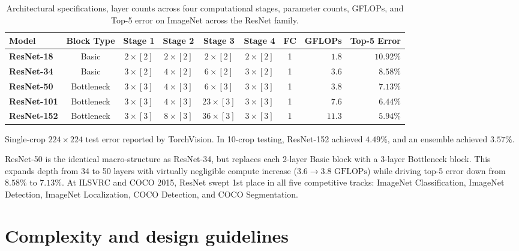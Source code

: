 \begin{table}[H]
\centering
\small
\setlength{\tabcolsep}{4.5pt}
\caption{Architectural specifications, layer counts across four computational stages, parameter counts, GFLOPs, and Top-5 error on ImageNet across the ResNet family.}
\label{tab:resnet_family_specs}
\vspace{4pt}
\begin{tabularx}{\textwidth}{l c c c c c c r r}
\toprule
\textbf{Model} & \textbf{Block Type} & \textbf{Stage 1} & \textbf{Stage 2} & \textbf{Stage 3} & \textbf{Stage 4} & \textbf{FC} & \textbf{GFLOPs} & \textbf{Top-5 Error} \\
\midrule
\textbf{ResNet-18}  & Basic & $2 \times [2]$ & $2 \times [2]$ & $2 \times [2]$ & $2 \times [2]$ & 1 & $1.8$ & $10.92\%$ \\
\textbf{ResNet-34}  & Basic & $3 \times [2]$ & $4 \times [2]$ & $6 \times [2]$ & $3 \times [2]$ & 1 & $3.6$ & $8.58\%$ \\
\textbf{ResNet-50}  & Bottleneck & $3 \times [3]$ & $4 \times [3]$ & $6 \times [3]$ & $3 \times [3]$ & 1 & $3.8$ & $7.13\%$ \\
\textbf{ResNet-101} & Bottleneck & $3 \times [3]$ & $4 \times [3]$ & $23 \times [3]$ & $3 \times [3]$ & 1 & $7.6$ & $6.44\%$ \\
\textbf{ResNet-152} & Bottleneck & $3 \times [3]$ & $8 \times [3]$ & $36 \times [3]$ & $3 \times [3]$ & 1 & $11.3$ & $\mathbf{5.94\%}$ \\
\bottomrule
\end{tabularx}
\vspace{2pt}
{\scriptsize Single-crop $224 \times 224$ test error reported by TorchVision. In 10-crop testing, ResNet-152 achieved $4.49\%$, and an ensemble achieved $3.57\%$.}
\end{table}

ResNet-50 is the identical macro-structure as ResNet-34, but replaces each 2-layer Basic block with a 3-layer Bottleneck block. This expands depth from 34 to 50 layers with virtually negligible compute increase ($3.6 \to 3.8\text{ GFLOPs}$) while driving top-5 error down from $8.58\%$ to $7.13\%$. At ILSVRC and COCO 2015, ResNet swept 1st place in all five competitive tracks: ImageNet Classification, ImageNet Detection, ImageNet Localization, COCO Detection, and COCO Segmentation.

\section{Complexity and design guidelines}
\label{sec:complexity_and_design_guidelines}

